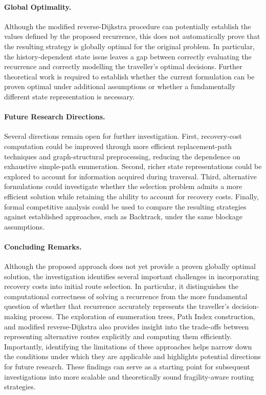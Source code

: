 \documentclass{article}
\begin{document}
\paragraph{Global Optimality.}

Although the modified reverse-Dijkstra procedure can potentially establish the values defined by the proposed recurrence, this does not automatically prove that the resulting strategy is globally optimal for the original problem. In particular, the history-dependent state issue leaves a gap between correctly evaluating the recurrence and correctly modelling the traveller's optimal decisions. Further theoretical work is required to establish whether the current formulation can be proven optimal under additional assumptions or whether a fundamentally different state representation is necessary.

\paragraph{Future Research Directions.}

Several directions remain open for further investigation. First, recovery-cost computation could be improved through more efficient replacement-path techniques and graph-structural preprocessing, reducing the dependence on exhaustive simple-path enumeration. Second, richer state representations could be explored to account for information acquired during traversal. Third, alternative formulations could investigate whether the selection problem admits a more efficient solution while retaining the ability to account for recovery costs. Finally, formal competitive analysis could be used to compare the resulting strategies against established approaches, such as Backtrack, under the same blockage assumptions.

\paragraph{Concluding Remarks.}

Although the proposed approach does not yet provide a proven globally optimal solution, the investigation identifies several important challenges in incorporating recovery costs into initial route selection. In particular, it distinguishes the computational correctness of solving a recurrence from the more fundamental question of whether that recurrence accurately represents the traveller's decision-making process. The exploration of enumeration trees, Path Index construction, and modified reverse-Dijkstra also provides insight into the trade-offs between representing alternative routes explicitly and computing them efficiently. Importantly, identifying the limitations of these approaches helps narrow down the conditions under which they are applicable and highlights potential directions for future research. These findings can serve as a starting point for subsequent investigations into more scalable and theoretically sound fragility-aware routing strategies.
\end{document}
